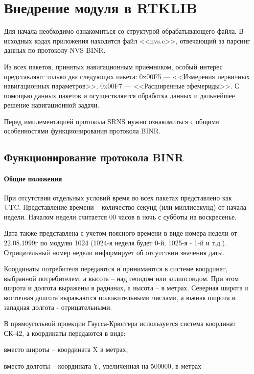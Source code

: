 \section{Внедрение модуля в RTKLIB}
Для начала необходимо ознакомиться со структурой обрабатывающего файла. В исходных кодах приложения находится файл <<nvs.c>>, отвечающий за парсинг данных по протоколу NVS BINR.

Из всех пакетов, принятых навигационным приёмником, особый интерес представляют только два следующих пакета: 0x00F5 — <<Измерения первичных навигационных параметров>>, 0x00F7 — <<Расширенные эфемериды>>. С помощью данных пакетов и осуществляется обработка данных и дальнейшее решение навигационной задачи.

Перед имплементацией протокола SRNS нужно ознакомиться с общими особенностями функционирования протокола BINR.

\subsection{Функционирование протокола BINR}

\paragraph{Общие положения}

При отсутствии отдельных условий время во всех пакетах представлено как UTC. Представление времени – количество
секунд (или миллисекунд) от начала недели. Началом недели считается 00 часов в ночь с
субботы на воскресенье.

Дата также представлена с учетом поясного времени в виде номера недели от
22.08.1999г по модулю 1024 (1024-я неделя будет 0-й, 1025-я - 1-й и т.д.). Отрицательный
номер недели информирует об отсутствии значения даты.

Координаты потребителя передаются и принимаются в системе координат,
выбранной потребителем, а высота -- над геоидом или эллипсоидом. При этом широта и
долгота выражены в радианах, а высота -- в метрах. Северная широта и восточная долгота
выражаются положительными числами, а южная широта и западная долгота -
отрицательными.

В прямоугольной проекции Гаусса-Крюггера используется система координат СК-42, а координаты передаются в виде:

вместо широты -- координата X в метрах,

вместо долготы -- координата Y, увеличенная на 500000, в метрах

